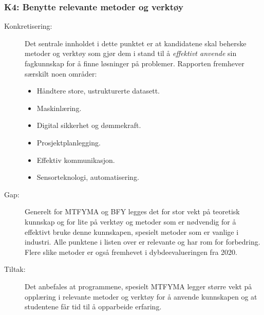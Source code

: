 \subsubsection{K4: Benytte relevante metoder og verktøy}
\begin{description}
\item[Konkretisering:] Det sentrale innholdet i dette punktet er at kandidatene skal beherske metoder og verktøy som gjør dem i stand til å \emph{effektivt anvende} sin fagkunnskap for å finne løsninger på problemer. Rapporten fremhever særskilt noen områder:
\begin{itemize}
	\item Håndtere store, ustrukturerte datasett.
	\item Maskinlæring.
	\item Digital sikkerhet og dømmekraft.
	\item Prosjektplanlegging.
	\item Effektiv kommunikasjon.
	\item Sensorteknologi, automatisering.
\end{itemize}

\item[Gap:]Generelt for MTFYMA og BFY legges det for stor vekt på teoretisk kunnskap og for lite på verktøy og metoder som er nødvendig for å effektivt bruke denne kunnskapen, spesielt metoder som er vanlige i industri. Alle punktene i listen over er relevante og har rom for forbedring. Flere slike metoder er også fremhevet i dybdeevalueringen fra 2020. 
\item[Tiltak:]Det anbefales at programmene, spesielt MTFYMA legger større vekt på opplæring i relevante metoder og verktøy for å anvende kunnskapen og at studentene får tid til å opparbeide erfaring.
\end{description}


